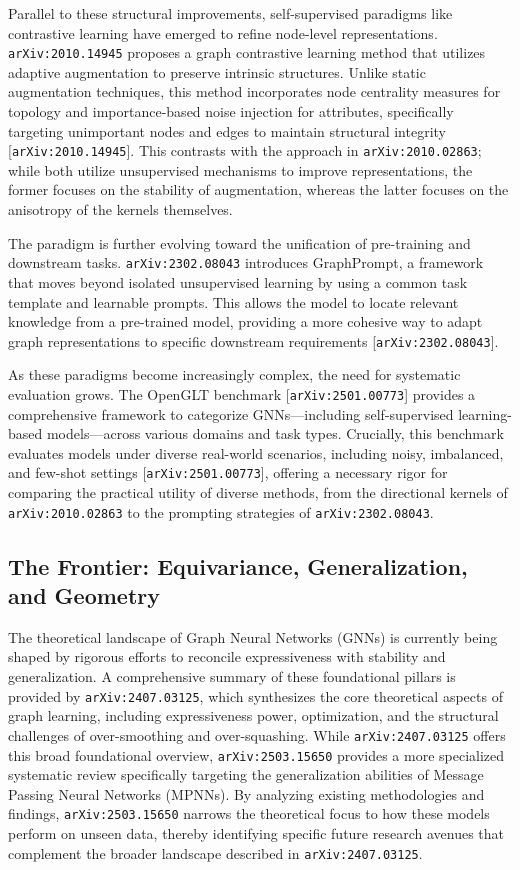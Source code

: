 \documentclass[11pt]{article}
\begin{document}
Parallel to these structural improvements, self-supervised paradigms like contrastive learning have emerged to refine node-level representations. \texttt{arXiv:2010.14945} proposes a graph contrastive learning method that utilizes adaptive augmentation to preserve intrinsic structures. Unlike static augmentation techniques, this method incorporates node centrality measures for topology and importance-based noise injection for attributes, specifically targeting unimportant nodes and edges to maintain structural integrity [\texttt{arXiv:2010.14945}]. This contrasts with the approach in \texttt{arXiv:2010.02863}; while both utilize unsupervised mechanisms to improve representations, the former focuses on the stability of augmentation, whereas the latter focuses on the anisotropy of the kernels themselves.

The paradigm is further evolving toward the unification of pre-training and downstream tasks. \texttt{arXiv:2302.08043} introduces GraphPrompt, a framework that moves beyond isolated unsupervised learning by using a common task template and learnable prompts. This allows the model to locate relevant knowledge from a pre-trained model, providing a more cohesive way to adapt graph representations to specific downstream requirements [\texttt{arXiv:2302.08043}].

As these paradigms become increasingly complex, the need for systematic evaluation grows. The OpenGLT benchmark [\texttt{arXiv:2501.00773}] provides a comprehensive framework to categorize GNNs—including self-supervised learning-based models—across various domains and task types. Crucially, this benchmark evaluates models under diverse real-world scenarios, including noisy, imbalanced, and few-shot settings [\texttt{arXiv:2501.00773}], offering a necessary rigor for comparing the practical utility of diverse methods, from the directional kernels of \texttt{arXiv:2010.02863} to the prompting strategies of \texttt{arXiv:2302.08043}.

\subsection{The Frontier: Equivariance, Generalization, and Geometry}

The theoretical landscape of Graph Neural Networks (GNNs) is currently being shaped by rigorous efforts to reconcile expressiveness with stability and generalization. A comprehensive summary of these foundational pillars is provided by \texttt{arXiv:2407.03125}, which synthesizes the core theoretical aspects of graph learning, including expressiveness power, optimization, and the structural challenges of over-smoothing and over-squashing. While \texttt{arXiv:2407.03125} offers this broad foundational overview, \texttt{arXiv:2503.15650} provides a more specialized systematic review specifically targeting the generalization abilities of Message Passing Neural Networks (MPNNs). By analyzing existing methodologies and findings, \texttt{arXiv:2503.15650} narrows the theoretical focus to how these models perform on unseen data, thereby identifying specific future research avenues that complement the broader landscape described in \texttt{arXiv:2407.03125}.
\end{document}
